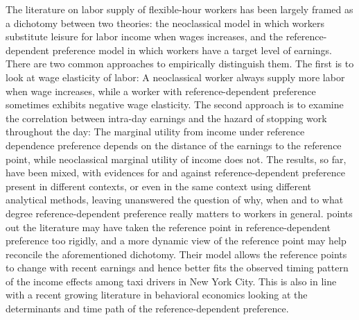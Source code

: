 \documentclass[reviewmode]{AEA}
\begin{document}
\maketitle



The literature on labor supply of flexible-hour workers has been largely framed as a dichotomy between two theories: the neoclassical model in which workers substitute leisure for labor income when wages increases, and the reference-dependent preference model in which workers have a target level of earnings. There are two common approaches to empirically distinguish them. The first is to look at wage elasticity of labor: A neoclassical worker always supply more labor when wage increases, while a worker with reference-dependent preference sometimes exhibits negative wage elasticity. 
The second approach is to examine the correlation between intra-day earnings and the hazard of stopping work throughout the day: The marginal utility from income under reference dependence preference depends on the distance of the earnings to the reference point, while neoclassical marginal utility of income does not. 
The results, so far, have been mixed, with evidences for and against reference-dependent preference present in different contexts, or even in the same context using different analytical methods, leaving unanswered the question of why, when and to what degree reference-dependent preference really matters to workers in general. \citet{thakral2018daily} points out the literature may have taken the reference point in reference-dependent preference too rigidly, and a more dynamic view of the reference point may help reconcile the aforementioned dichotomy. Their model allows  the reference points to change with recent earnings and hence better fits the observed timing pattern of the income effects among taxi drivers in New York City. This is also in line with a recent growing literature in behavioral economics looking at the determinants and time path of the reference-dependent preference.
\end{document}
